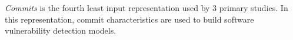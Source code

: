 \textit{Commits} is the fourth least input representation used by 3 primary studies. In this representation, commit characteristics are used to build software vulnerability detection models. 









